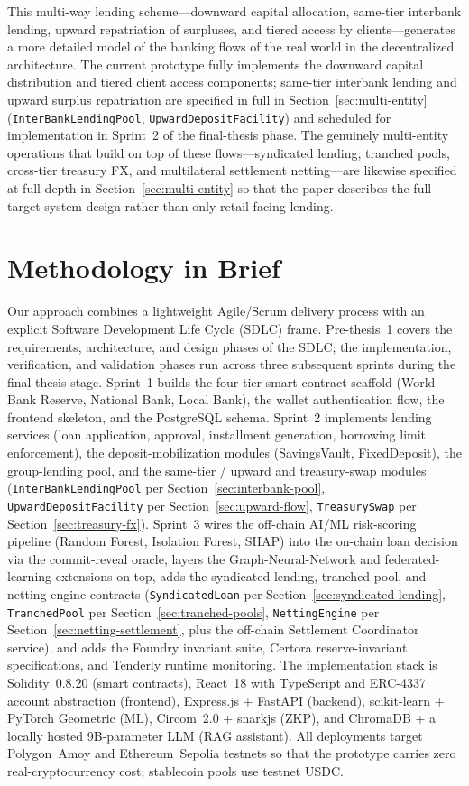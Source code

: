 \documentclass[12pt,a4paper]{report}
\begin{document}
This multi-way lending scheme---downward capital allocation, same-tier interbank lending, upward repatriation of surpluses, and tiered access by clients---generates a more detailed model of the banking flows of the real world in the decentralized architecture. The current prototype fully implements the downward capital distribution and tiered client access components; same-tier interbank lending and upward surplus repatriation are specified in full in Section~\ref{sec:multi-entity} (\texttt{InterBankLendingPool}, \texttt{UpwardDepositFacility}) and scheduled for implementation in Sprint~2 of the final-thesis phase. The genuinely multi-entity operations that build on top of these flows---syndicated lending, tranched pools, cross-tier treasury FX, and multilateral settlement netting---are likewise specified at full depth in Section~\ref{sec:multi-entity} so that the paper describes the full target system design rather than only retail-facing lending.

\section{Methodology in Brief}

Our approach combines a lightweight Agile/Scrum delivery process with an explicit Software Development Life Cycle (SDLC) frame. Pre-thesis~1 covers the requirements, architecture, and design phases of the SDLC; the implementation, verification, and validation phases run across three subsequent sprints during the final thesis stage. Sprint~1 builds the four-tier smart contract scaffold (World Bank Reserve, National Bank, Local Bank), the wallet authentication flow, the frontend skeleton, and the PostgreSQL schema. Sprint~2 implements lending services (loan application, approval, installment generation, borrowing limit enforcement), the deposit-mobilization modules (SavingsVault, FixedDeposit), the group-lending pool, and the same-tier / upward and treasury-swap modules (\texttt{InterBankLendingPool} per Section~\ref{sec:interbank-pool}, \texttt{UpwardDepositFacility} per Section~\ref{sec:upward-flow}, \texttt{TreasurySwap} per Section~\ref{sec:treasury-fx}). Sprint~3 wires the off-chain AI/ML risk-scoring pipeline (Random Forest, Isolation Forest, SHAP) into the on-chain loan decision via the commit-reveal oracle, layers the Graph-Neural-Network and federated-learning extensions on top, adds the syndicated-lending, tranched-pool, and netting-engine contracts (\texttt{SyndicatedLoan} per Section~\ref{sec:syndicated-lending}, \texttt{TranchedPool} per Section~\ref{sec:tranched-pools}, \texttt{NettingEngine} per Section~\ref{sec:netting-settlement}, plus the off-chain Settlement Coordinator service), and adds the Foundry invariant suite, Certora reserve-invariant specifications, and Tenderly runtime monitoring. The implementation stack is Solidity~0.8.20 (smart contracts), React~18 with TypeScript and ERC-4337 account abstraction (frontend), Express.js + FastAPI (backend), scikit-learn + PyTorch Geometric (ML), Circom~2.0 + snarkjs (ZKP), and ChromaDB + a locally hosted 9B-parameter LLM (RAG assistant). All deployments target Polygon~Amoy and Ethereum~Sepolia testnets so that the prototype carries zero real-cryptocurrency cost; stablecoin pools use testnet USDC.
\end{document}
